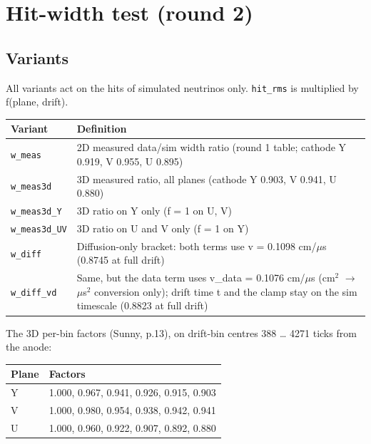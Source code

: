 \documentclass[10pt,a4paper]{article}
\begin{document}
\section{Hit-width test (round 2)}
\subsection{Variants}
All variants act on the hits of simulated neutrinos only. \texttt{hit\_\allowbreak{}rms} is multiplied by f(plane, drift).

\begin{center}\small
\setlength{\tabcolsep}{3pt}\renewcommand{\arraystretch}{1.15}
\begin{tabularx}{\linewidth}{LL}
\toprule
\textbf{Variant} & \textbf{Definition} \\
\midrule
\texttt{w\_\allowbreak{}meas} & 2D measured data/sim width ratio (round 1 table; cathode Y 0.919, V 0.955, U 0.895) \\
\texttt{w\_\allowbreak{}meas3d} & 3D measured ratio, all planes (cathode Y 0.903, V 0.941, U 0.880) \\
\texttt{w\_\allowbreak{}meas3d\_\allowbreak{}Y} & 3D ratio on Y only (f = 1 on U, V) \\
\texttt{w\_\allowbreak{}meas3d\_\allowbreak{}UV} & 3D ratio on U and V only (f = 1 on Y) \\
\texttt{w\_\allowbreak{}diff} & Diffusion-only bracket: both terms use v = 0.1098 cm/$\mu$s (0.8745 at full drift) \\
\texttt{w\_\allowbreak{}diff\_\allowbreak{}vd} & Same, but the data term uses v\_data = 0.1076 cm/$\mu$s (cm$^2$ $\rightarrow$ $\mu$s$^2$ conversion only); drift time t and the clamp stay on the sim timescale (0.8823 at full drift) \\
\bottomrule
\end{tabularx}
\end{center}
The 3D per-bin factors (Sunny, p.13), on drift-bin centres 388 \ldots{} 4271 ticks from the anode:

\begin{center}\small
\setlength{\tabcolsep}{3pt}\renewcommand{\arraystretch}{1.15}
\begin{tabularx}{\linewidth}{LL}
\toprule
\textbf{Plane} & \textbf{Factors} \\
\midrule
Y & 1.000, 0.967, 0.941, 0.926, 0.915, 0.903 \\
V & 1.000, 0.980, 0.954, 0.938, 0.942, 0.941 \\
U & 1.000, 0.960, 0.922, 0.907, 0.892, 0.880 \\
\bottomrule
\end{tabularx}
\end{center}
\end{document}
